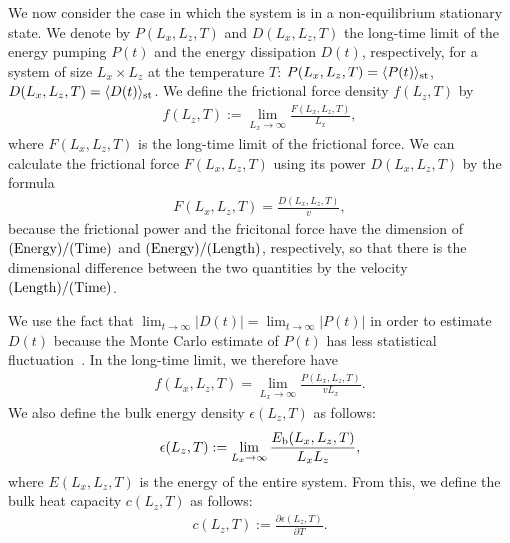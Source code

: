 We now consider the case in which the system is in a non-equilibrium stationary state. We denote by $P(L_{x}, L_{z}, T)$ and $D(L_{x}, L_{z}, T)$ the long-time limit of the energy pumping $P(t)$ and the energy dissipation $D(t)$, respectively, for a system of size $L_{x}\times L_{z}$ at the temperature $T$: $P(L_{x},L_{z},T)=\langle P(t)\rangle_{\rm st}$, $D(L_{x},L_{z},T)=\langle D(t)\rangle_{\rm st}$. We define the frictional force density $f(L_{z}, T)$ by
\begin{align}
f(L_{z}, T):=\lim_{L_{x}\to\infty}\frac{F(L_{x}, L_{z}, T)}{L_{x}},
\end{align}
where $F(L_{x}, L_{z}, T)$ is the long-time limit of the frictional force. We can calculate the frictional force $F(L_{x}, L_{z}, T)$ using its power $D(L_{x}, L_{z}, T)$ by the formula
\begin{align}
F(L_{x}, L_{z}, T)=\frac{D(L_{x}, L_{z}, T)}{v}\label{for:frictionalforce},
\end{align}
because the frictional power and the fricitonal force have the dimension of $(\rm Energy) / (\rm Time)$ and $(\rm Energy) / (\rm Length)$, respectively, so that there is the dimensional difference between the two quantities by the velocity $(\rm Length) / (\rm Time)$.

We use the fact that $\lim_{t\to\infty}|D(t)|=\lim_{t\to\infty}|P(t)|$ in order to estimate $D(t)$ because the Monte Carlo estimate of $P(t)$ has less statistical fluctuation~\cite{Magiera2009a, Magiera2011, Magiera2011b}. In the long-time limit, we therefore have
\begin{align}
f(L_{x}, L_{z}, T)=\lim_{L_{x}\to\infty}\frac{P(L_{x}, L_{z}, T)}{vL_{x}}\label{for:frictionalforce2}.
\end{align}
We also define the bulk energy density $\epsilon(L_{z}, T)$ as follows:
\begin{align}
\epsilon(L_{z}, T):=\lim_{L_{x}\to\infty}\frac{E_{\rm b}(L_{x}, L_{z}, T)}{L_{x}L_{z}},
\end{align}
where $E(L_{x}, L_{z}, T)$ is the energy of the entire system. From this, we define the bulk heat capacity $c(L_{z}, T)$ as follows:
\begin{align}
c(L_{z}, T):=\frac{\partial \epsilon(L_{z}, T)}{\partial T}.
\end{align}